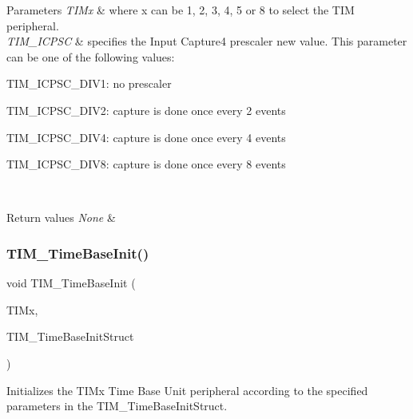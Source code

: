 \begin{DoxyParams}{Parameters}
{\em T\+I\+Mx} & where x can be 1, 2, 3, 4, 5 or 8 to select the T\+IM peripheral. \\
\hline
{\em T\+I\+M\+\_\+\+I\+C\+P\+SC} & specifies the Input Capture4 prescaler new value. This parameter can be one of the following values\+: \begin{DoxyItemize}
\item T\+I\+M\+\_\+\+I\+C\+P\+S\+C\+\_\+\+D\+I\+V1\+: no prescaler \item T\+I\+M\+\_\+\+I\+C\+P\+S\+C\+\_\+\+D\+I\+V2\+: capture is done once every 2 events \item T\+I\+M\+\_\+\+I\+C\+P\+S\+C\+\_\+\+D\+I\+V4\+: capture is done once every 4 events \item T\+I\+M\+\_\+\+I\+C\+P\+S\+C\+\_\+\+D\+I\+V8\+: capture is done once every 8 events \end{DoxyItemize}
\\
\hline
\end{DoxyParams}

\begin{DoxyRetVals}{Return values}
{\em None} & \\
\hline
\end{DoxyRetVals}
\mbox{\label{group___t_i_m___exported___functions_ga83fd58c9416802d9638bbe1715c98932}} 
\subsubsection{\texorpdfstring{TIM\_TimeBaseInit()}{TIM\_TimeBaseInit()}}
{\footnotesize\ttfamily void T\+I\+M\+\_\+\+Time\+Base\+Init (\begin{DoxyParamCaption}\item[{\mbox{\hyperlink{struct_t_i_m___type_def}{T\+I\+M\+\_\+\+Type\+Def}} $\ast$}]{T\+I\+Mx,  }\item[{\mbox{\hyperlink{struct_t_i_m___time_base_init_type_def}{T\+I\+M\+\_\+\+Time\+Base\+Init\+Type\+Def}} $\ast$}]{T\+I\+M\+\_\+\+Time\+Base\+Init\+Struct }\end{DoxyParamCaption})}



Initializes the T\+I\+Mx Time Base Unit peripheral according to the specified parameters in the T\+I\+M\+\_\+\+Time\+Base\+Init\+Struct. 


